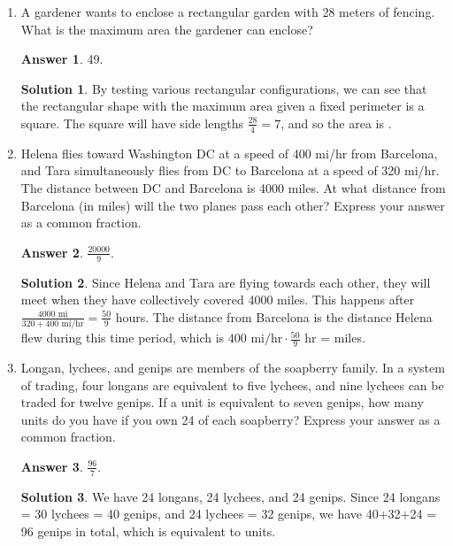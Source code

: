 \documentclass[11pt]{article}
\theoremstyle{definition}
\newtheorem*{solution}{Solution}
\newtheorem*{answer}{Answer}
\begin{document}
\begin{enumerate}
\item %
A gardener wants to enclose a rectangular garden with 28 meters of fencing. What is the maximum area the gardener can enclose?

\begin{answer}
49.
\end{answer}
\begin{solution}
 By testing various rectangular configurations, we can see that the rectangular shape with the maximum area given a fixed perimeter is a square. The square will have side lengths $\frac{28}{4} = 7$, and so the area is .
\end{solution}

\item %
Helena flies toward Washington DC at a speed of 400 mi/hr from Barcelona, and Tara simultaneously flies from DC to Barcelona at a speed of 320 mi/hr. The distance between DC and Barcelona is 4000 miles. At what distance from Barcelona (in miles) will the two planes pass each other? Express your answer as a common fraction.

\begin{answer}
$\frac{20000}{9}$.
\end{answer}
\begin{solution}
 Since Helena and Tara are flying towards each other, they will meet when they have collectively covered 4000 miles. This happens after $\frac{4000 \text{ mi}}{320 + 400 \text{ mi/hr}} = \frac{50}{9}$ hours. The distance from Barcelona is the distance Helena flew during this time period, which is $400 \text{ mi/hr} \cdot \frac{50}{9} \text{ hr}$ =  miles.
\end{solution}

\item %
Longan, lychees, and genips are members of the soapberry family. In a system of trading, four longans are equivalent to five lychees, and nine lychees can be traded for twelve genips. If a unit is equivalent to seven genips, how many units do you have if you own 24 of each soapberry? Express your answer as a common fraction.

\begin{answer}
$\frac{96}{7}$.
\end{answer}
\begin{solution}
 We have 24 longans, 24 lychees, and 24 genips. Since 24 longans = 30 lychees = 40 genips, and 24 lychees = 32 genips, we have 40+32+24 = 96 genips in total, which is equivalent to  units.
\end{solution}


\end{enumerate}
\end{document}
